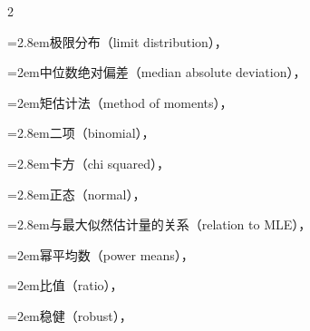 \begin{multicols}{2}
\par\noindent\hangindent=2.8em\hspace*{1.8em}\label{idx:804}极限分布（limit distribution），\hyperref[ex:10.2.3]{\pageref*{ex:10.2.3}}\par
\par\noindent\hangindent=2em\hspace*{1em}\label{idx:805}中位数绝对偏差（median absolute deviation），\hyperref[exercise:10.21]{\pageref*{exercise:10.21}}\par
\par\noindent\hangindent=2em\hspace*{1em}\label{idx:806}矩估计法（method of moments），\hyperref[sec:7.2.1]{\pageref*{sec:7.2.1}}\par
\par\noindent\hangindent=2.8em\hspace*{1.8em}\label{idx:807}二项（binomial），\hyperref[ex:7.2.2]{\pageref*{ex:7.2.2}}\par
\par\noindent\hangindent=2.8em\hspace*{1.8em}\label{idx:808}卡方（chi squared），\hyperref[ex:7.2.3]{\pageref*{ex:7.2.3}}\par
\par\noindent\hangindent=2.8em\hspace*{1.8em}\label{idx:809}正态（normal），\hyperref[ex:7.2.1]{\pageref*{ex:7.2.1}}\par
\par\noindent\hangindent=2.8em\hspace*{1.8em}\label{idx:810}与最大似然估计量的关系（relation to MLE），\hyperref[sec:7.5.1]{\pageref*{sec:7.5.1}}\par
\par\noindent\hangindent=2em\hspace*{1em}\label{idx:811}幂平均数（power means），\hyperref[exercise:7.16]{\pageref*{exercise:7.16}}\par
\par\noindent\hangindent=2em\hspace*{1em}\label{idx:812}比值（ratio），\hyperref[ex:5.5.27]{\pageref*{ex:5.5.27}}\par
\par\noindent\hangindent=2em\hspace*{1em}\label{idx:813}稳健（robust），\hyperref[idxocc:813:420]{\pageref*{idxocc:813:420}}\par

\end{multicols}

